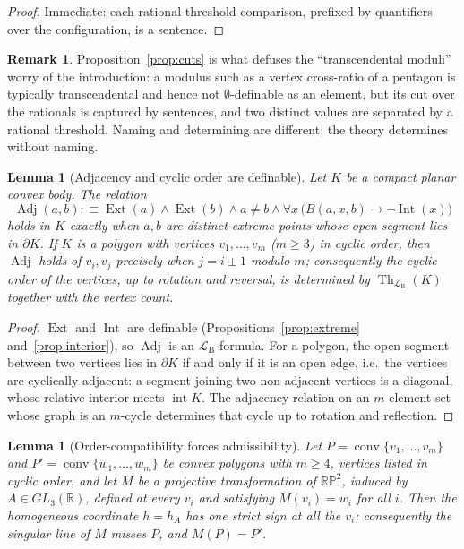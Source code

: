 \documentclass[11pt]{amsart}
\newtheorem{lemma}[theorem]{Lemma}
\theoremstyle{definition}
\newtheorem{remark}[theorem]{Remark}
\newcommand{\R}{\mathbb{R}}
\newcommand{\RP}{\mathbb{RP}}
\newcommand{\LB}{\mathcal{L}_{\mathrm{B}}}
\newcommand{\Ext}{\operatorname{Ext}}
\newcommand{\Adj}{\operatorname{Adj}}
\newcommand{\Int}{\operatorname{Int}}
\newcommand{\conv}{\operatorname{conv}}
\newcommand{\interior}{\operatorname{int}}
\newcommand{\Th}{\operatorname{Th}}
\begin{document}
\begin{proof}
Immediate: each rational-threshold comparison, prefixed by quantifiers over
the configuration, is a sentence.
\end{proof}

\begin{remark}
Proposition~\ref{prop:cuts} is what defuses the ``transcendental moduli''
worry of the introduction: a modulus such as a vertex cross-ratio of a
pentagon is typically transcendental and hence not $\emptyset$-definable as
an element, but its cut over the rationals is captured by sentences, and two
distinct values are separated by a rational threshold. Naming and
determining are different; the theory determines without naming.
\end{remark}

\begin{lemma}[Adjacency and cyclic order are definable]\label{lem:adjacency}
Let $K$ be a compact planar convex body. The relation
\[
\Adj(a,b):\equiv \Ext(a)\wedge\Ext(b)\wedge a\ne b\wedge
\forall x\,\bigl(B(a,x,b)\to\neg\Int(x)\bigr)
\]
holds in $K$ exactly when $a,b$ are distinct extreme points whose open
segment lies in $\partial K$. If $K$ is a polygon with vertices
$v_1,\dots,v_m$ \textup($m\ge3$\textup) in cyclic order, then $\Adj$ holds
of $v_i,v_j$ precisely when $j=i\pm1$ modulo $m$; consequently the cyclic
order of the vertices, up to rotation and reversal, is determined by
$\Th_{\LB}(K)$ together with the vertex count.
\end{lemma}

\begin{proof}
$\Ext$ and $\Int$ are definable (Propositions~\ref{prop:extreme}
and~\ref{prop:interior}), so $\Adj$ is an $\LB$-formula. For a polygon, the
open segment between two vertices lies in $\partial K$ if and only if it is
an open edge, i.e.\ the vertices are cyclically adjacent: a segment joining
two non-adjacent vertices is a diagonal, whose relative interior meets
$\interior K$. The adjacency relation on an $m$-element set whose graph is
an $m$-cycle determines that cycle up to rotation and reflection.
\end{proof}

\begin{lemma}[Order-compatibility forces admissibility]\label{lem:admissible}
Let $P=\conv\{v_1,\dots,v_m\}$ and $P'=\conv\{w_1,\dots,w_m\}$ be convex
polygons with $m\ge4$, vertices listed in cyclic order, and let $M$ be a
projective transformation of $\RP^2$, induced by $A\in GL_3(\R)$, defined at
every $v_i$ and satisfying $M(v_i)=w_i$ for all $i$. Then the homogeneous
coordinate $h=h_A$ has one strict sign at all the $v_i$; consequently the
singular line of $M$ misses $P$, and $M(P)=P'$.
\end{lemma}
\end{document}
